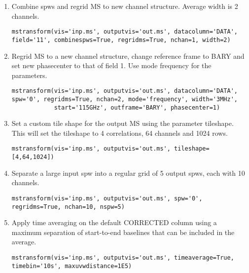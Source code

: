 \begin{enumerate}
\item Combine spws and regrid MS to new channel structure. Average width is 2 channels.
\begin{verbatim}
mstransform(vis='inp.ms', outputvis='out.ms', datacolumn='DATA', field='11', combinespws=True, regridms=True, nchan=1, width=2)
\end{verbatim}
\item Regrid MS to a new channel structure, change reference frame to BARY and
set new phasecenter to that of field 1. Use mode frequency for the parameters.
\begin{verbatim}
mstransform(vis='inp.ms', outputvis='out.ms', datacolumn='DATA', spw='0', regridms=True, nchan=2, mode='frequency', width='3MHz',
            start='115GHz', outframe='BARY', phasecenter=1)
\end{verbatim}
\item Set a custom tile shape for the output MS using the parameter tileshape. This will
set the tileshape to 4 correlations, 64 channels and 1024 rows.
\begin{verbatim}
mstransform(vis='inp.ms', outputvis='out.ms', tileshape=[4,64,1024])
\end{verbatim}
\item Separate a large input spw into a regular grid of 5 output spws, each with 10 channels.
\begin{verbatim}
mstransform(vis='inp.ms', outputvis='out.ms', spw='0', regridms=True, nchan=10, nspw=5)
\end{verbatim}
\item Apply time averaging on the default CORRECTED column using a maximum separation of start-to-end 
baselines that can be included in the average.
\begin{verbatim}
mstransform(vis='inp.ms', outputvis='out.ms', timeaverage=True, timebin='10s', maxuvwdistance=1E5)
\end{verbatim}


\end{enumerate}

